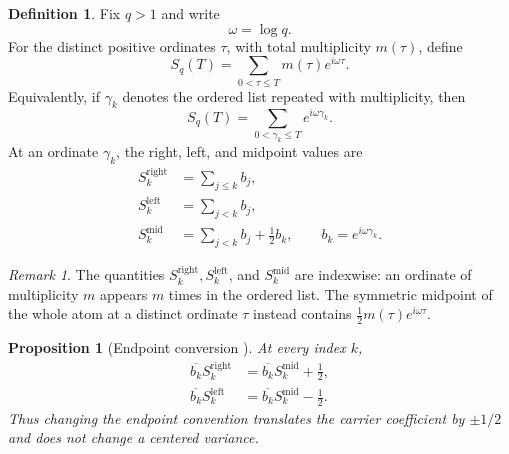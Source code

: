 \documentclass[11pt]{amsart}
\numberwithin{equation}{section}
\theoremstyle{plain}
\newtheorem{proposition}[theorem]{Proposition}
\theoremstyle{definition}
\newtheorem{definition}[theorem]{Definition}
\theoremstyle{remark}
\newtheorem{remark}[theorem]{Remark}
\newcommand{\1}{\mathbf{1}}
\begin{document}
\begin{definition}
\label{def:phase_walk_q}
Fix \(q>1\) and write
\begin{equation}
\omega=\log q.
\label{eq:omega_definition}
\end{equation}
For the distinct positive ordinates \(\tau\), with total
multiplicity \(m(\tau)\), define
\begin{equation}
S_q(T)
=
\sum_{0<\tau\leq T}m(\tau)e^{i\omega\tau}.
\label{eq:Sq_definition}
\end{equation}
Equivalently, if \(\gamma_k\) denotes the ordered list repeated with
multiplicity, then
\begin{equation}
S_q(T)=\sum_{0<\gamma_k\leq T}e^{i\omega\gamma_k}.
\label{eq:Sq_indexed_equivalent}
\end{equation}
At an ordinate \(\gamma_k\), the right, left, and midpoint values are
\begin{align}
S_k^{\mathrm{right}}
&=
\sum_{j\leq k}b_j,
\label{eq:right_sum}
\\
S_k^{\mathrm{left}}
&=
\sum_{j<k}b_j,
\label{eq:left_sum}
\\
S_k^{\mathrm{mid}}
&=
\sum_{j<k}b_j+\frac12b_k,
\qquad
b_k=e^{i\omega\gamma_k}.
\label{eq:mid_sum}
\end{align}
\end{definition}

\begin{remark}
\label{rem:indexwise_vs_atomic_midpoint}
The quantities \(S_k^{\mathrm{right}},S_k^{\mathrm{left}}\), and
\(S_k^{\mathrm{mid}}\) are indexwise: an ordinate of multiplicity \(m\)
appears \(m\) times in the ordered list.  The symmetric midpoint of the
whole atom at a distinct ordinate \(\tau\) instead contains
\(\frac12m(\tau)e^{i\omega\tau}\).
\end{remark}


\begin{proposition}[Endpoint conversion {}]
\label{prop:endpoint_conversion}
At every index \(k\),
\begin{align}
\overline{b_k}S_k^{\mathrm{right}}
&=
\overline{b_k}S_k^{\mathrm{mid}}+\frac12,
\label{eq:right_mid_conversion}
\\
\overline{b_k}S_k^{\mathrm{left}}
&=
\overline{b_k}S_k^{\mathrm{mid}}-\frac12.
\label{eq:left_mid_conversion}
\end{align}
Thus changing the endpoint convention translates the carrier coefficient
by \(\pm1/2\) and does not change a centered variance.
\end{proposition}
\end{document}
